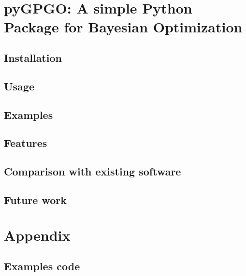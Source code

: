 \documentclass[10pt,a4paper,twoside]{book}
\begin{document}
\chapter{pyGPGO: A simple Python Package for Bayesian Optimization}
\section{Installation}
\section{Usage}
\section{Examples}
\section{Features}\label{features}
\section{Comparison with existing software}
\section{Future work}

\chapter*{Appendix}
\section*{Examples code}
\end{document}
